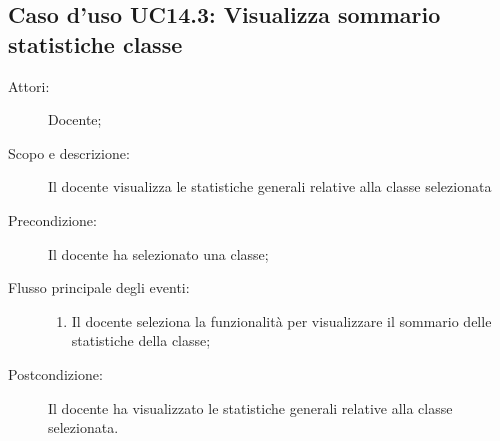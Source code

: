 \subsection{Caso d'uso UC14.3: Visualizza sommario statistiche classe}\begin{description}
\item[Attori:] Docente;
\item[Scopo e descrizione:] Il docente visualizza le statistiche generali relative alla classe selezionata
      \item[Precondizione:] Il docente ha selezionato una classe;

        \item[Flusso principale degli eventi:] \begin{enumerate}
          \item Il docente seleziona la funzionalità per visualizzare il sommario delle statistiche della classe;

      \end{enumerate}
    \item[Postcondizione:] Il docente ha visualizzato le statistiche generali relative alla classe selezionata.
  \end{description}
\hypertarget{UC14.4}{}
